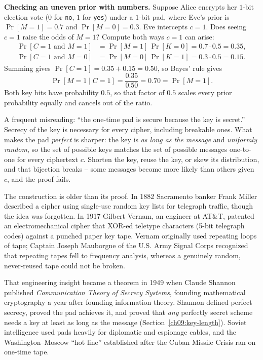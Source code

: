 \begin{whybox}
\textbf{Checking an uneven prior with numbers.} Suppose Alice encrypts her $1$-bit election vote ($0$ for \texttt{no}, $1$ for \texttt{yes}) under a $1$-bit pad, where Eve's prior is $\Pr[M = 1] = 0.7$ and $\Pr[M = 0] = 0.3$. Eve intercepts $c = 1$. Does seeing $c = 1$ raise the odds of $M = 1$? Compute both ways $c = 1$ can arise:
\begin{align*}
  \Pr[C = 1 \text{ and } M = 1] &= \Pr[M = 1]\,\Pr[K = 0] = 0.7 \cdot 0.5 = 0.35, \\
  \Pr[C = 1 \text{ and } M = 0] &= \Pr[M = 0]\,\Pr[K = 1] = 0.3 \cdot 0.5 = 0.15.
\end{align*}
Summing gives $\Pr[C = 1] = 0.35 + 0.15 = 0.50$, so Bayes' rule gives
\[
  \Pr[M = 1 \mid C = 1] = \frac{0.35}{0.50} = 0.70 = \Pr[M = 1].
\]
Both key bits have probability $0.5$, so that factor of $0.5$ scales every prior probability equally and cancels out of the ratio.
\end{whybox}

\begin{trapbox}
A frequent misreading: ``the one-time pad is secure because the key is secret.'' Secrecy of the key is necessary for every cipher, including breakable ones. What makes the pad \emph{perfect} is sharper: the key is \emph{as long as the message} and \emph{uniformly random}, so the set of possible keys matches the set of possible messages one-to-one for every ciphertext $c$. Shorten the key, reuse the key, or skew its distribution, and that bijection breaks -- some messages become more likely than others given $c$, and the proof fails.
\end{trapbox}

\begin{historybox}
The construction is older than its proof. In 1882 Sacramento banker Frank Miller described a cipher using single-use random key lists for telegraph traffic, though the idea was forgotten. In 1917 Gilbert Vernam, an engineer at AT\&T, patented an electromechanical cipher that XOR-ed teletype characters (5-bit telegraph codes) against a punched paper key tape. Vernam originally used repeating loops of tape; Captain Joseph Mauborgne of the U.S. Army Signal Corps recognized that repeating tapes fell to frequency analysis, whereas a genuinely random, never-reused tape could not be broken.

That engineering insight became a theorem in 1949 when Claude Shannon published \emph{Communication Theory of Secrecy Systems}, founding mathematical cryptography a year after founding information theory. Shannon defined perfect secrecy, proved the pad achieves it, and proved that \emph{any} perfectly secret scheme needs a key at least as long as the message (Section~\ref{ch09:key-length}). Soviet intelligence used pads heavily for diplomatic and espionage cables, and the Washington--Moscow ``hot line'' established after the Cuban Missile Crisis ran on one-time tape.
\end{historybox}

